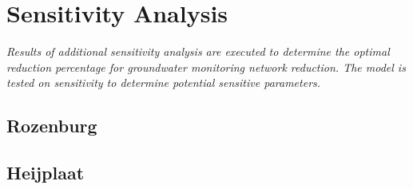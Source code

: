 \chapter{Sensitivity Analysis}

\emph{Results of additional sensitivity analysis are executed to determine the optimal reduction percentage for groundwater monitoring network reduction. The model is tested on sensitivity to determine potential sensitive parameters.}

\section{Rozenburg}








\section{Heijplaat}